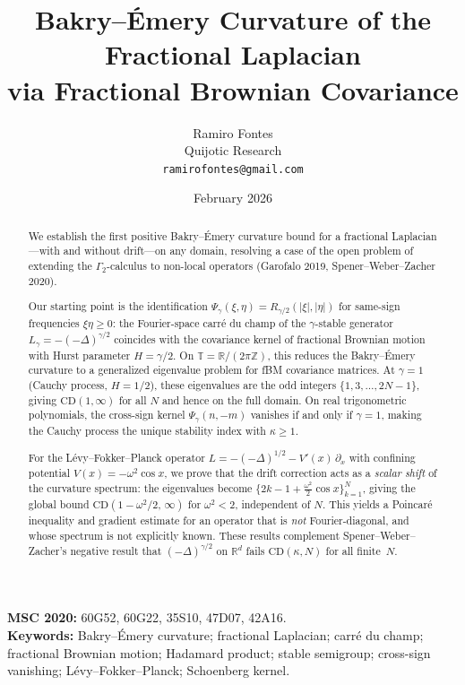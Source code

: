 \documentclass[11pt,a4paper]{article}
\title{Bakry--\'Emery Curvature of the Fractional Laplacian\\
via Fractional Brownian Covariance}
\author{Ramiro Fontes\\
Quijotic Research\\
\texttt{ramirofontes@gmail.com}}
\date{February 2026}
\theoremstyle{plain}
\theoremstyle{definition}
\theoremstyle{remark}
\newcommand{\R}{\mathbb{R}}
\newcommand{\Z}{\mathbb{Z}}
\newcommand{\T}{\mathbb{T}}
\begin{document}
\maketitle

\begin{abstract}
We establish the first positive Bakry--\'Emery curvature bound for
a fractional Laplacian---with and without drift---on any domain,
resolving a case of the open problem of extending the $\Gamma_2$-calculus
to non-local operators (Garofalo 2019, Spener--Weber--Zacher 2020).

Our starting point is the identification
$\Psi_\gamma(\xi,\eta) = R_{\gamma/2}(|\xi|,|\eta|)$
for same-sign frequencies $\xi\eta \geq 0$:
the Fourier-space carr\'e du champ of the $\gamma$-stable generator
$L_\gamma = -(-\Delta)^{\gamma/2}$ coincides with the covariance
kernel of fractional Brownian motion with Hurst parameter $H = \gamma/2$.
On $\T = \R/(2\pi\Z)$, this reduces the Bakry--\'Emery curvature
to a generalized eigenvalue problem for fBM covariance matrices.
At $\gamma = 1$ (Cauchy process, $H = 1/2$), these eigenvalues are the
odd integers $\{1,3,\ldots,2N{-}1\}$, giving $\mathrm{CD}(1,\infty)$
for all $N$ and hence on the full domain.
On real trigonometric polynomials, the cross-sign kernel
$\Psi_\gamma(n,-m)$ vanishes if and only if $\gamma = 1$,
making the Cauchy process the unique stability index with $\kappa \geq 1$.

For the L\'evy--Fokker--Planck operator
$L = -(-\Delta)^{1/2} - V'(x)\,\partial_x$ with confining potential
$V(x) = -\omega^2\cos x$, we prove that the drift correction acts
as a \emph{scalar shift} of the curvature spectrum: the eigenvalues
become $\{2k{-}1 + \frac{\omega^2}{2}\cos x\}_{k=1}^N$,
giving the global bound $\mathrm{CD}(1-\omega^2/2,\,\infty)$
for $\omega^2 < 2$, independent of $N$.
This yields a Poincar\'e inequality and gradient estimate for an
operator that is \emph{not} Fourier-diagonal, and whose spectrum
is not explicitly known.
These results complement Spener--Weber--Zacher's negative result
that $(-\Delta)^{\gamma/2}$ on $\R^d$ fails
$\mathrm{CD}(\kappa,N)$ for all finite~$N$.
\end{abstract}

\medskip
\noindent\textbf{MSC 2020:} 60G52, 60G22, 35S10, 47D07, 42A16.\\
\textbf{Keywords:} Bakry--\'Emery curvature; fractional Laplacian;
carr\'e du champ; fractional Brownian motion; Hadamard product;
stable semigroup; cross-sign vanishing; L\'evy--Fokker--Planck;
Schoenberg kernel.
\end{document}

